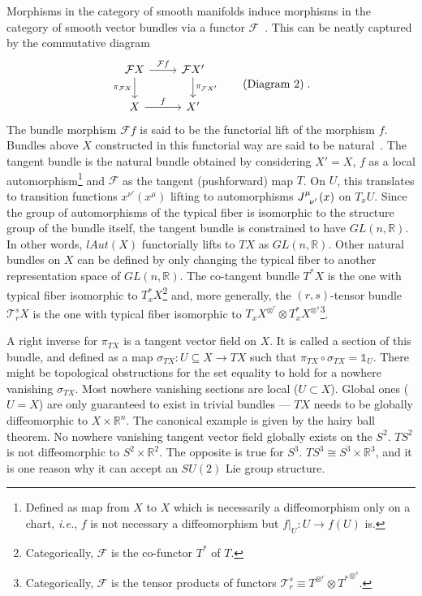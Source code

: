 \documentclass[../../main.tex]{subfiles}
\begin{document}
Morphisms in the category of smooth manifolds induce morphisms in the category of smooth vector bundles via a functor $ \mathcal{F} $~\cite{tu2011}. This can be neatly captured by the commutative diagram
\begin{equation}
  \label{dia:categorical_lift}
  \begin{tikzcd}
    \mathcal{F}X
    \arrow[r, "\mathcal{F}f"]
    \arrow[d, "\pi_{\mathcal{F}X}" left]
    &
    \mathcal{F}X'
    \arrow[d, "\pi_{\mathcal{F}X'}" ]
    \\
    X
    \arrow[r, "f"]
    &
    X'
  \end{tikzcd} \tag{Diagram 2} \;.
\end{equation}
The bundle morphism $ \mathcal{F} f $ is said to be the functorial lift of the morphism $ f $. Bundles above $ X $ constructed in this functorial way are said to be natural~\cite{kolar2000}. The tangent bundle is the natural bundle obtained by considering $ X' = X$, $ f $ as a local automorphism\footnote{Defined as map from $ X $ to $ X $ which is necessarily a diffeomorphism only on a chart, \textit{i.e.}, $ f $ is not necessary a diffeomorphism but $ f|_U: U \rightarrow f(U) $ is.} and $\mathcal{F}$ as the tangent (pushforward) map $T$. On $U$, this translates to transition functions $ x^{\nu'} \left( x^\mu \right) $ lifting to automorphisms $\tensor{J}{^\mu_{\nu'}}(x)$ on $T_x U$. Since the group of automorphisms of the typical fiber is isomorphic to the structure group of the bundle itself, the tangent bundle is constrained to have $ GL \left( n, \mathbb{R} \right) $. In other words, $ lAut \left( X \right) $ functorially lifts to $ TX $ as $ GL\left( n,\mathbb{R} \right) $. Other natural bundles on $ X $ can be defined by only changing the typical fiber to another representation space of $ GL \left( n, \mathbb{R} \right) $. The co-tangent bundle $T^* X$ is the one with typical fiber isomorphic to ${T}^*_x X$\footnote{Categorically, $\mathcal{F}$ is the co-functor $T^*$ of $T$.} and, more generally, the $(r,s)$-tensor bundle $\mathcal{T}^s_r X$ is the one with typical fiber isomorphic to $T_x X^{\otimes^r}\otimes T^*_x X^{\otimes^s}$\footnote{Categorically, $\mathcal{F}$ is the tensor products of functors $\mathcal{T}^s_r\equiv T^{ \otimes^r } \otimes {T^*}^{ \otimes^s }$.}.

A right inverse for $\pi_{TX}$ is a tangent vector field on $X$. It is called a section of this bundle, and defined as a map $\sigma_{TX}: U \subseteq X \rightarrow TX$ such that $\pi_{TX} \circ \sigma_{TX} = \mathds{1}_U$. There might be topological obstructions for the set equality to hold for a nowhere vanishing $\sigma_{TX}$. Most nowhere vanishing sections are local ($U\subset X$). Global ones ($U=X$) are only guaranteed to exist in trivial bundles --- $TX$ needs to be globally diffeomorphic to $X \times \mathbb{R}^n$. The canonical example is given by the hairy ball theorem. No nowhere vanishing tangent vector field globally exists on the $S^2$. $TS^2$ is not diffeomorphic to $S^{2} \times \mathbb{R}^{2}$. The opposite is true for $S^3$. $TS^{3} \cong S^{3} \times \mathbb{R}^{3}$, and it is one reason why it can accept an $SU(2)$ Lie group structure.
\end{document}
